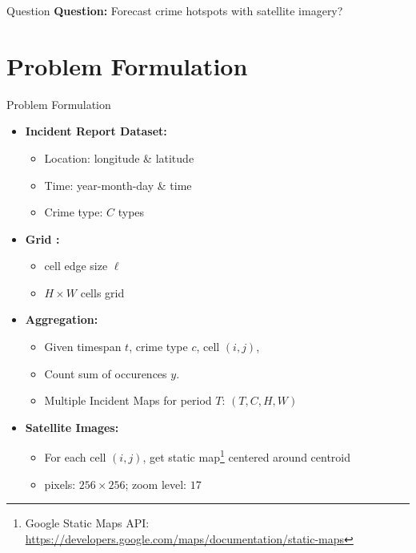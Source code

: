 \documentclass[10pt]{beamer}
\begin{document}
\begin{frame}{Question}
\centering
{\large
\textbf{Question:} Forecast crime hotspots with satellite imagery?
}
\end{frame}



\section{Problem Formulation}
\begin{frame}{Problem Formulation}
\begin{itemize}
    \item \textbf{Incident Report Dataset:}
    \begin{itemize}
        \item Location: longitude \& latitude
        \item Time: year-month-day \& time
        \item Crime type: $C$ types
    \end{itemize}
    \item \textbf{Grid \citep{lin2018grid}:}
    \begin{itemize}
        \item cell edge size $\ell$
        \item $H \times W$ cells grid
    \end{itemize}
    \item \textbf{Aggregation:}
    \begin{itemize}
        \item Given timespan $t$, crime type $c$, cell $(i,j)$, 
        \item Count sum of occurences $y$.
        \item Multiple Incident Maps for period $T$: $(T, C, H, W)$
    \end{itemize}
    \item \textbf{Satellite Images:}
    \begin{itemize}
        \item For each cell $(i,j)$, get static map\footnote{Google Static Maps API: \url{https://developers.google.com/maps/documentation/static-maps}} centered around centroid
        \item pixels: $256\times 256$; zoom level: $17$
    \end{itemize}

    
\end{itemize}

\end{frame}
\end{document}
